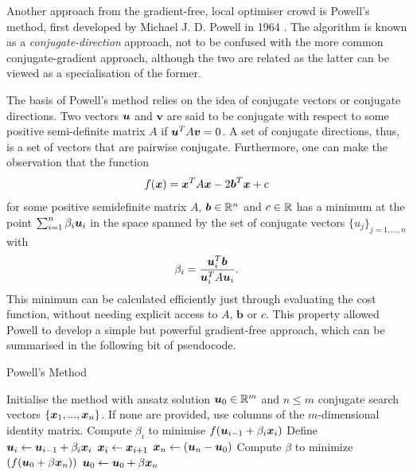 Another approach from the gradient-free, local optimiser crowd is Powell's method, first developed by Michael J. D. Powell in 1964 \cite{powell_efficient_1964}. The algorithm is known as a \emph{conjugate-direction} approach, not to be confused with the more common conjugate-gradient approach, although the two are related as the latter can be viewed as a specialisation of the former. 

The basis of Powell's method relies on the idea of conjugate vectors or conjugate directions. Two vectors $\boldsymbol{u}$ and $\boldsymbol{v}$ are said to be conjugate with respect to some positive semi-definite matrix $A$ if $\boldsymbol{u}^T A \boldsymbol{v} = 0$. A set of conjugate directions, thus, is a set of vectors that are pairwise conjugate. Furthermore, one can make the observation \cite{brent_algorithms_2002} that the function
\begin{equation}
    f(\boldsymbol{x}) = \boldsymbol{x}^T A \boldsymbol{x} - 2\boldsymbol{b}^T \boldsymbol{x} + c
\end{equation}
for some positive semidefinite matrix $A$, $\boldsymbol{b} \in \mathbb{R}^n$ and $c \in \mathbb{R}$ has a minimum at the point $\sum_{i=1}^n \beta_i \boldsymbol{u}_i$ in the space spanned by the set of conjugate vectors $\{ u_j \}_{j = 1,...,n}$ with
\begin{equation}
    \beta_i = \frac{\boldsymbol{u}_i^T\boldsymbol{b}}{\boldsymbol{u}_i^T A \boldsymbol{u}_i}.
\end{equation}
This minimum can be calculated efficiently just through evaluating the cost function, without needing explicit access to $A$, $\boldsymbol{b}$ or $c$. This property allowed Powell to develop a simple but powerful gradient-free approach, which can be summarised in the following bit of pseudocode.
\begin{algorithm}
\caption{Powell's Method}
\begin{algorithmic}[1]
\State Initialise the method with ansatz solution $\boldsymbol{u}_0 \in \mathbb{R}^m$ and $n \leq m$ conjugate search vectors $\{\boldsymbol{x}_1, ..., \boldsymbol{x}_n \}$. If none are provided, use columns of the $m$-dimensional identity matrix.
\State Compute $\beta_i$ to minimise $f(\boldsymbol{u}_{i - 1} + \beta_i \boldsymbol{x}_i)$
\State Define $\boldsymbol{u}_i \gets \boldsymbol{u}_{i - 1} + \beta_i \boldsymbol{x}_i$
\EndFor
{}
\State $\boldsymbol{x}_{i} \gets \boldsymbol{x}_{i+1}$
\EndFor
\State $\boldsymbol{x}_n \gets (\boldsymbol{u}_n - \boldsymbol{u}_0)$
\State Compute $\beta$ to minimize $(f(\boldsymbol{u}_0  + \beta \boldsymbol{x}_n))$
\State $\boldsymbol{u}_0 \gets \boldsymbol{u}_0 + \beta \boldsymbol{x}_n$
\EndProcedure
\end{algorithmic}
\end{algorithm}


